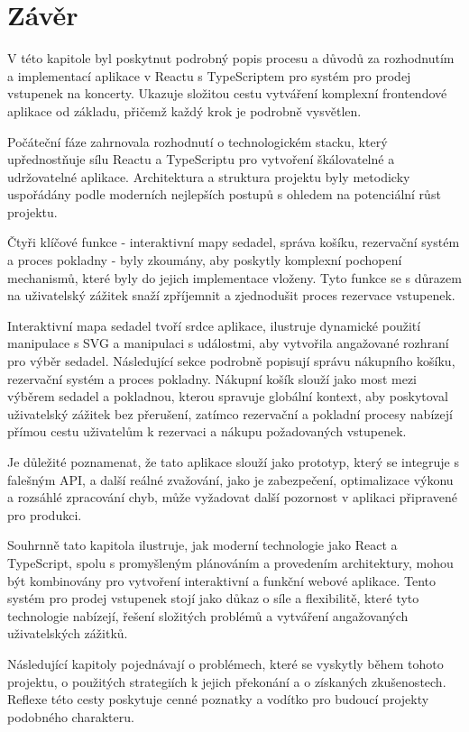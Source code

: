 \section{Závěr}
\label{sec:implementace-zaver}
V této kapitole byl poskytnut podrobný popis procesu a důvodů za rozhodnutím a implementací aplikace v Reactu s TypeScriptem pro systém pro prodej vstupenek na koncerty.
Ukazuje složitou cestu vytváření komplexní frontendové aplikace od základu, přičemž každý krok je podrobně vysvětlen.

Počáteční fáze zahrnovala rozhodnutí o technologickém stacku, který upřednostňuje sílu Reactu a TypeScriptu pro vytvoření škálovatelné a udržovatelné aplikace.
Architektura a struktura projektu byly metodicky uspořádány podle moderních nejlepších postupů s ohledem na potenciální růst projektu.

Čtyři klíčové funkce - interaktivní mapy sedadel, správa košíku, rezervační systém a proces pokladny - byly zkoumány, aby poskytly komplexní pochopení mechanismů, které byly do jejich implementace vloženy.
Tyto funkce se s důrazem na uživatelský zážitek snaží zpříjemnit a zjednodušit proces rezervace vstupenek.

Interaktivní mapa sedadel tvoří srdce aplikace, ilustruje dynamické použití manipulace s SVG a manipulaci s událostmi, aby vytvořila angažované rozhraní pro výběr sedadel.
Následující sekce podrobně popisují správu nákupního košíku, rezervační systém a proces pokladny.
Nákupní košík slouží jako most mezi výběrem sedadel a pokladnou, kterou spravuje globální kontext, aby poskytoval uživatelský zážitek bez přerušení, zatímco rezervační a pokladní procesy nabízejí přímou cestu uživatelům k rezervaci a nákupu požadovaných vstupenek.

Je důležité poznamenat, že tato aplikace slouží jako prototyp, který se integruje s falešným API, a další reálné zvažování, jako je zabezpečení, optimalizace výkonu a rozsáhlé zpracování chyb, může vyžadovat další pozornost v aplikaci připravené pro produkci.

Souhrnně tato kapitola ilustruje, jak moderní technologie jako React a TypeScript, spolu s promyšleným plánováním a provedením architektury, mohou být kombinovány pro vytvoření interaktivní a funkční webové aplikace.
Tento systém pro prodej vstupenek stojí jako důkaz o síle a flexibilitě, které tyto technologie nabízejí, řešení složitých problémů a vytváření angažovaných uživatelských zážitků.


Následující kapitoly pojednávají o problémech, které se vyskytly během tohoto projektu, o použitých strategiích k jejich překonání a o získaných zkušenostech.
Reflexe této cesty poskytuje cenné poznatky a vodítko pro budoucí projekty podobného charakteru.
